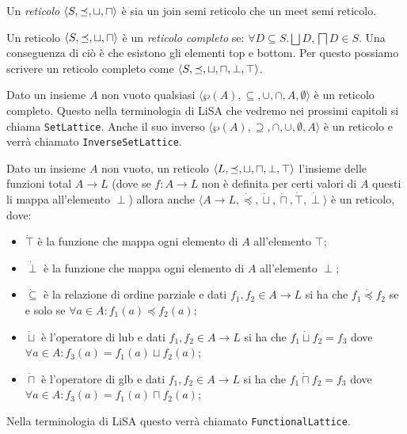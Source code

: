 \begin{definition}[Reticolo]
Un \textit{reticolo} \(\langle S, \preceq,\sqcup, \sqcap\rangle\) è sia un join semi reticolo che un meet semi reticolo.
\end{definition}

\begin{definition}
Un reticolo \(\langle S, \preceq,\sqcup, \sqcap\rangle\) è un \textit{reticolo completo} se: \(\forall D\subseteq S.\bigsqcup D,\bigsqcap D\in S\). Una conseguenza di ciò è che esistono gli elementi top e bottom. Per questo possiamo scrivere un reticolo completo come \(\langle S, \preceq,\sqcup, \sqcap, \perp, \top\rangle\).
\end{definition}

\begin{example}\label{ex:setLattice}
Dato un insieme \(A\) non vuoto qualsiasi \(\langle\wp(A), \subseteq, \cup, \cap, A, \emptyset\rangle\) è un reticolo completo. Questo nella terminologia di LiSA che vedremo nei prossimi capitoli si chiama \texttt{SetLattice}. Anche il suo inverso \(\langle\wp(A), \supseteq, \cap, \cup, \emptyset, A\rangle\) è un reticolo e verrà chiamato \texttt{InverseSetLattice}.
\end{example}

\begin{example}\label{ex:functionalLattice}
Dato un insieme \(A\) non vuoto, un reticolo \(\langle L, \preceq,\sqcup, \sqcap, \perp, \top\rangle\) l'insieme delle funzioni total \(A\rightarrow L\) (dove se \(f:A\rightarrow L\) non è definita per certi valori di \(A\) questi li mappa all'elemento \(\perp\))  allora anche \(\langle A\rightarrow L, \dot{\preceq}, \dot{\sqcup}, \dot{\sqcap}, \dot{\top}, \dot{\perp}\rangle\) è un reticolo, dove:
\begin{itemize}
    \item \(\dot{\top}\) è la funzione che mappa ogni elemento di \(A\) all'elemento \(\top\); 
    \item \(\dot{\perp}\) è la funzione che mappa ogni elemento di \(A\) all'elemento \(\perp\); 
    \item \(\dot{\subseteq}\) è la relazione di ordine parziale e dati \(f_1, f_2\in A\rightarrow L\) si ha che \(f_1\dot{\preceq} f_2\) se e solo se \(\forall a\in A: f_1(a) \preceq f_2(a)\);
    \item\(\dot{\sqcup}\) è l'operatore di lub e dati \(f_1, f_2\in A\rightarrow L\) si ha che \(f_1\dot{\sqcup}f_2=f_3\) dove \(\forall a\in A: f_3(a)=f_1(a)\sqcup f_2(a)\); 
    \item\(\dot{\sqcap}\) è l'operatore di glb e dati \(f_1, f_2\in A\rightarrow L\) si ha che \(f_1\dot{\sqcap}f_2=f_3\) dove \(\forall a\in A: f_3(a)=f_1(a)\sqcap f_2(a)\); 
\end{itemize}
Nella terminologia di LiSA questo verrà chiamato \texttt{FunctionalLattice}.
\end{example}


